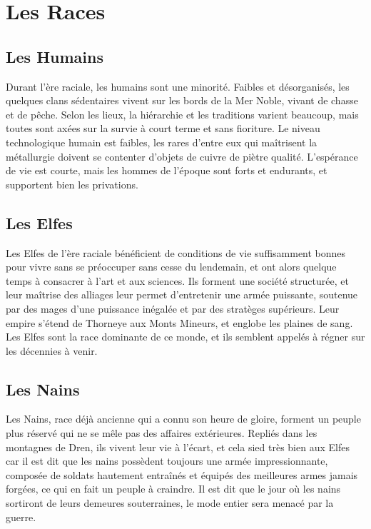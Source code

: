 \chapter{Les Races}
\section{Les Humains}
Durant l'ère raciale, les humains sont une minorité. Faibles et désorganisés, les quelques clans sédentaires vivent sur les bords de la Mer Noble, vivant de chasse et de pêche. Selon les lieux, la hiérarchie et les traditions varient beaucoup, mais toutes sont axées sur la survie à court terme et sans fioriture. Le niveau technologique humain est faibles, les rares d'entre eux qui maîtrisent la métallurgie doivent se contenter d'objets de cuivre de piètre qualité. L'espérance de vie est courte, mais les hommes de l'époque sont forts et endurants, et supportent bien les privations.

\section{Les Elfes}
Les Elfes de l'ère raciale bénéficient de conditions de vie suffisamment bonnes pour vivre sans se préoccuper sans cesse du lendemain, et ont alors quelque temps à consacrer à l'art et aux sciences. Ils forment une société structurée, et leur maîtrise des alliages leur permet d'entretenir une armée puissante, soutenue par des mages d'une puissance inégalée et par des stratèges supérieurs. Leur empire s'étend de Thorneye aux Monts Mineurs, et englobe les plaines de sang. Les Elfes sont la race dominante de ce monde, et ils semblent appelés à régner sur les décennies à venir.

\section{Les Nains}
Les Nains, race déjà ancienne qui a connu son heure de gloire, forment un peuple plus réservé qui ne se mêle pas des affaires extérieures. Repliés dans les montagnes de Dren, ils vivent leur vie à l'écart, et cela sied très bien aux Elfes car il est dit que les nains possèdent toujours une armée impressionnante, composée de soldats hautement entraînés et équipés des meilleures armes jamais forgées, ce qui en fait un peuple à craindre. Il est dit que le jour où les nains sortiront de leurs demeures souterraines, le mode entier sera menacé par la guerre.

